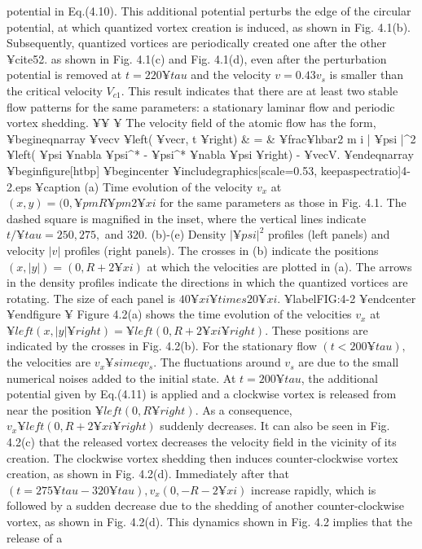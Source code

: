 {{{{{potential in Eq.(4.10). This additional potential perturbs the
edge of the circular potential, at which quantized vortex
creation is induced, as shown in Fig. 4.1(b). Subsequently,
quantized vortices are periodically created one after the other ¥cite{52}.
as shown in Fig. 4.1(c) and Fig. 4.1(d), even after the 
perturbation potential is removed at $t=220 ¥tau$ and the
velocity $v= 0.43 v_s$ is smaller than the critical velocity
$V_{c1}$. This result indicates that there are at least
two stable flow patterns for the same parameters: a stationary
laminar flow and periodic vortex shedding.
¥¥
¥ The velocity field of the atomic flow has the form,
¥begin{eqnarray}
¥vec{v} ¥left( ¥vec{r}, t ¥right) & = &
¥frac{¥hbar}{2 m i | ¥psi |^2} ¥left( ¥psi ¥nabla ¥psi^* - ¥psi^* ¥nabla ¥psi ¥right) - ¥vec{V}.
¥end{eqnarray}
¥begin{figure}[htbp]
¥begin{center}
¥includegraphics[scale=0.53, keepaspectratio]{4-2.eps}
¥caption{
(a) Time evolution of the velocity $v_x$ at
$(x,y)=(0, ¥pm R ¥pm 2 ¥xi$ for the same parameters as those in Fig. 4.1.
The dashed square is magnified in the inset, where the vertical lines
indicate $t/¥tau = 250,275,$ and $320$. (b)-(e) Density $|¥psi|^2$ profiles (left
panels) and velocity $|v|$ profiles (right panels). The crosses in (b)
indicate the positions $(x,|y|)=(0,R+2 ¥xi)$ at which the velocities
are plotted in (a). The arrows in the density profiles indicate the
directions in which the quantized vortices are rotating. The size of
each panel is $40 ¥xi ¥times 20 ¥xi$.
}
¥label{FIG:4-2}
¥end{center}
¥end{figure}
¥ Figure 4.2(a) shows the time evolution of the velocities
$v_x$ at $ ¥left( x, |y| ¥right) = ¥left( 0, R + 2 ¥xi ¥right)$. 
These positions are indicated by the crosses in Fig. 4.2(b).
For the stationary flow $(t < 200 ¥tau),$ the velocities are 
$v_x ¥simeq v_s$. The fluctuations around $v_s$ are due to
the small numerical noises added
to the initial state. At $t=200 ¥tau$, the additional potential
given by Eq.(4.11) is applied and a clockwise vortex is 
released from near the position $¥left( 0, R ¥right)$. As a consequence,
$v_x ¥left( 0, R+ 2 ¥xi ¥right)$ suddenly decreases. It can also be seen in
Fig. 4.2(c) that the released vortex decreases the velocity
field in the vicinity of its creation. The clockwise vortex
shedding then induces counter-clockwise vortex creation,
as shown in Fig. 4.2(d). Immediately after that $(t=275 ¥tau -320 ¥tau),
v_x(0,-R-2¥xi)$ increase rapidly, which is followed
by a sudden decrease due to the shedding of another
counter-clockwise vortex, as shown in Fig. 4.2(d). This
dynamics shown in Fig. 4.2 implies that the release of a
}}}}}
